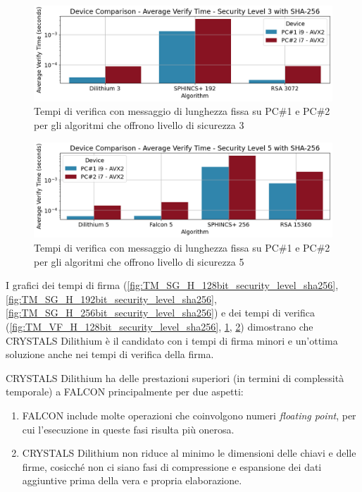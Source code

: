 \begin{figure}[H]
    \centering
    \includegraphics[width=1\textwidth]{Immagini/comparison/Time_Verify/TM_VF_H_192bit_security_level_sha256.png}
    \caption{Tempi di verifica con messaggio di lunghezza fissa su PC\#1 e PC\#2 per gli algoritmi che offrono livello di sicurezza 3}
    \label{fig:TM_VF_H_192bit_security_level_sha256}
\end{figure}

\begin{figure}[H]
    \centering
    \includegraphics[width=1\textwidth]{Immagini/comparison/Time_Verify/TM_VF_H_256bit_security_level_sha256.png}
    \caption{Tempi di verifica con messaggio di lunghezza fissa su PC\#1 e PC\#2 per gli algoritmi che offrono livello di sicurezza 5}
    \label{fig:TM_VF_H_256bit_security_level_sha256}
\end{figure}

I grafici dei tempi di firma (\ref{fig:TM_SG_H_128bit_security_level_sha256}, \ref{fig:TM_SG_H_192bit_security_level_sha256}, \ref{fig:TM_SG_H_256bit_security_level_sha256}) e dei tempi di verifica (\ref{fig:TM_VF_H_128bit_security_level_sha256}, \ref{fig:TM_VF_H_192bit_security_level_sha256}, \ref{fig:TM_VF_H_256bit_security_level_sha256}) dimostrano che CRYSTALS Dilithium è il candidato con i tempi di firma minori e un'ottima soluzione anche nei tempi di verifica della firma.

CRYSTALS Dilithium ha delle prestazioni superiori (in termini di complessità temporale) a FALCON principalmente per due aspetti:
\begin{enumerate}
    \item FALCON include molte operazioni che coinvolgono numeri \textit{floating point}, per cui l'esecuzione in queste fasi risulta più onerosa.
    \item CRYSTALS Dilithium non riduce al minimo le dimensioni delle chiavi e delle firme, cosicché non ci siano fasi di compressione e espansione dei dati aggiuntive prima della vera e propria elaborazione.
\end{enumerate}

